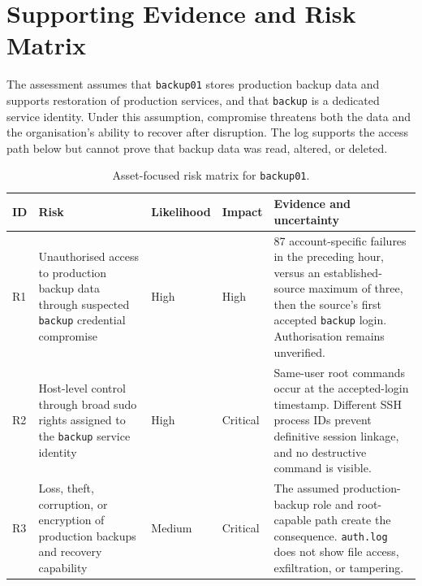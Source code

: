 
\clearpage
\appendix
\renewcommand{\thetable}{\Alph{section}.\arabic{table}}
\renewcommand{\thefigure}{\Alph{section}.\arabic{figure}}
\setcounter{table}{0}
\setcounter{figure}{0}

\section{Supporting Evidence and Risk Matrix}
\label{app:evidence-risk}
\setcounter{table}{0}
\setcounter{figure}{0}

The assessment assumes that \texttt{backup01} stores production backup data and supports restoration of production services, and that \texttt{backup} is a dedicated service identity. Under this assumption, compromise threatens both the data and the organisation's ability to recover after disruption. The log supports the access path below but cannot prove that backup data was read, altered, or deleted.

\begin{table}[H]
\centering
\caption{Asset-focused risk matrix for \texttt{backup01}.}
\label{tab:app-risk-matrix}
\scriptsize
\begin{tabularx}{0.9\linewidth}{L{0.55cm}L{2.9cm}L{1.35cm}L{1.1cm}Y}
\toprule
ID & Risk & Likelihood & Impact & Evidence and uncertainty \\
\midrule
R1 & Unauthorised access to production backup data through suspected \texttt{backup} credential compromise & High & High & 87 account-specific failures in the preceding hour, versus an established-source maximum of three, then the source's first accepted \texttt{backup} login. Authorisation remains unverified. \\
R2 & Host-level control through broad sudo rights assigned to the \texttt{backup} service identity & High & Critical & Same-user root commands occur at the accepted-login timestamp. Different SSH process IDs prevent definitive session linkage, and no destructive command is visible. \\
R3 & Loss, theft, corruption, or encryption of production backups and recovery capability & Medium & Critical & The assumed production-backup role and root-capable path create the consequence. \texttt{auth.log} does not show file access, exfiltration, or tampering. \\
\bottomrule
\end{tabularx}
\end{table}

